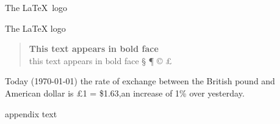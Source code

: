 \documentclass[12pt,twoside,a4paper]{article}   %
\begin{document}
	The \LaTeX\ logo

	The {\LaTeX} logo

	\begin{quote}
		{\bfseries This text appears in bold face}\\
		\setlength{\parindent}{0.5cm} this text appears in bold face
		\setlength{\textwidth}{12.5cm}
			\S 
			\ddag 
			\P
			\copyright 
			\pounds			
	\end{quote}
	Today (\today) the rate of exchange between the British pound and American dollar is \pounds 1 = \$1.63,an increase of 1\% over yesterday.

	\setlength{\parskip}{1.5ex} %
	\setlength{\parindent}{0em} %
	\renewcommand{\baselinestretch}{2} %
	\setlength{\textwidth}{12.5cm} %
	\begin{appendix}
		appendix text
	\end{appendix}
\end{document}
